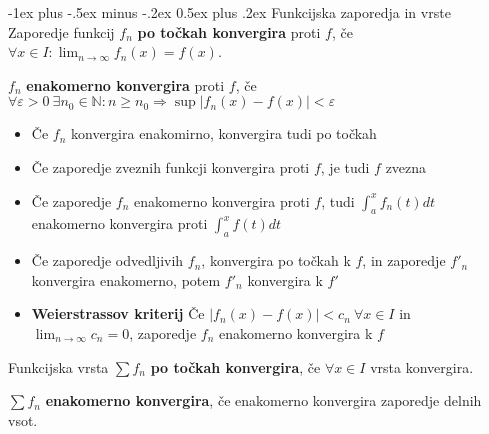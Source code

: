 \documentclass[a4paper,8pt]{extarticle}
\makeatletter
\renewcommand{\section}{\@startsection{section}{1}{0mm}%
                                {-1ex plus -.5ex minus -.2ex}%
                                {0.5ex plus .2ex}%
                                {\normalfont\large\bfseries}}
\makeatother
\begin{document}
\begin{multicols}{4}
\section{Funkcijska zaporedja in vrste}
Zaporedje funkcij $f_n$ \textbf{po točkah konvergira} proti $f$, če $\forall x \in I : \lim_{n \to \infty} f_n(x) = f(x)$.

$f_n$ \textbf{enakomerno konvergira} proti $f$, če $\forall \varepsilon > 0\ \exists n_0 \in \mathbb{N} : n \geq n_0 \Rightarrow \sup |f_n(x) - f(x) | < \varepsilon$

\begin{itemize}
    \item Če $f_n$ konvergira enakomirno, konvergira tudi po točkah
    \item Če zaporedje zveznih funkcji konvergira proti $f$, je tudi $f$ zvezna
    \item Če zaporedje $f_n$ enakomerno konvergira proti $f$, tudi $\int_a^x f_n(t) dt$ enakomerno konvergira proti $\int_a^x f(t) dt$ 
    \item Če zaporedje odvedljivih $f_n$, konvergira po točkah k $f$, in zaporedje $f'_n$ konvergira enakomerno, potem $f'_n$ konvergira k $f'$
    \item \textbf{Weierstrassov kriterij} Če $|f_n(x)-f(x)| < c_n\ \forall x \in I$ in $\lim_{n \to \infty} c_n = 0$, zaporedje $f_n$ enakomerno konvergira k $f$
\end{itemize}


Funkcijska vrsta $\sum f_n$ \textbf{po točkah konvergira}, če $\forall x \in I$ vrsta konvergira.

$\sum f_n$ \textbf{enakomerno konvergira}, če enakomerno konvergira zaporedje delnih vsot.
\end{multicols}
\end{document}
